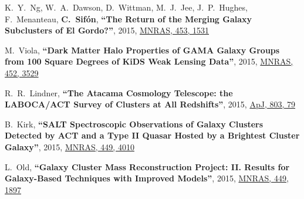 \documentclass{article}
\def\myself{\textbf{\color{red} C.~Sif\'on}}
\def\apj{ApJ}
\def\mnras{MNRAS}
\newcommand{\paper}[1]{\textbf{``#1''}}
\begin{document}
\begin{etaremune}
\item
K.~Y.~Ng, W.~A.~Dawson, D.~Wittman, M.~J.~Jee, J.~P.~Hughes, F.~Menanteau, \myself,
\paper{The Return of the Merging Galaxy Subclusters of El Gordo?},
2015, \href{http://adsabs.harvard.edu/abs/2015MNRAS.453.1531N}{\mnras, 453, 1531}

\item
M.~Viola, 
\paper{Dark Matter Halo Properties of GAMA Galaxy Groups from 100 Square Degrees of KiDS Weak 
Lensing Data},
2015, \href{http://adsabs.harvard.edu/adsabs/abs/2015MNRAS.452.3528V}{\mnras, 452, 3529}

\item
R.~R.~Lindner, 
\paper{The Atacama Cosmology Telescope: the LABOCA/ACT Survey of Clusters at All Redshifts},
2015, \href{http://adsabs.harvard.edu/adsabs/abs/2015ApJ...803...79L}{\apj, 803, 79}

\item
B.~Kirk, 
\paper{SALT Spectroscopic Observations of Galaxy Clusters Detected by ACT and a Type II Quasar 
Hosted by a Brightest Cluster Galaxy},
2015, \href{http://adsabs.harvard.edu/adsabs/abs/2015MNRAS.449.4010K}{\mnras, 449, 4010}

\item
L.~Old, 
\paper{Galaxy Cluster Mass Reconstruction Project: II. Results for Galaxy-Based Techniques with 
Improved Models},
2015, \href{http://adsabs.harvard.edu/adsabs/abs/2015MNRAS.449.1897O}{\mnras, 449, 1897}


\end{etaremune}
\end{document}
